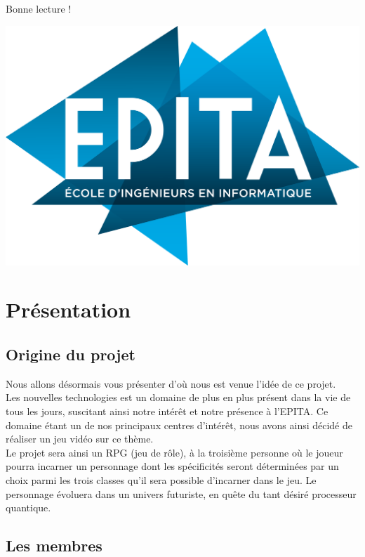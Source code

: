 \documentclass[A4paper,11pt]{article}
\begin{document}
\begin{center}
Bonne lecture !
\end{center}
\begin{center}
\includegraphics[scale=0.06]{epita_logo.png}
\end{center}
\newpage
\section{Pr\'esentation}

\subsection{Origine du projet}
Nous allons d\'esormais vous pr\'esenter d'o\`u nous est venue l'id\'ee de ce projet.\\

Les nouvelles technologies est un domaine de plus en plus pr\'esent dans la vie de tous les jours, suscitant ainsi notre int\'er\^et et notre pr\'esence \`a l'EPITA. Ce domaine \'etant un de nos principaux centres d'int\'er\^et, nous avons ainsi d\'ecid\'e de r\'ealiser un jeu vid\'eo sur ce th\`eme.\\
Le projet sera ainsi un RPG (jeu de r\^ole), \`a la troisi\`eme personne o\`u le joueur pourra incarner un personnage dont les sp\'ecificit\'es seront d\'etermin\'ees par un choix parmi les trois classes qu'il sera possible d'incarner dans le jeu. Le personnage \'evoluera dans un univers futuriste, en qu\^ete du tant d\'esir\'e processeur quantique.

\subsection{Les membres}
\end{document}
